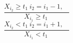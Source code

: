 $$\frac{X_{i_{2}} \geq t_{1}~i_{2}=i_{1}-1,~~~~}{X_{i_{1}} \geq t_{1}~}$$ $$\frac{X_{i_{2}}<t_{1}~i_{2}=i_{1}+1,~~~~}{X_{i_{1}}<t_{1}~}$$ 